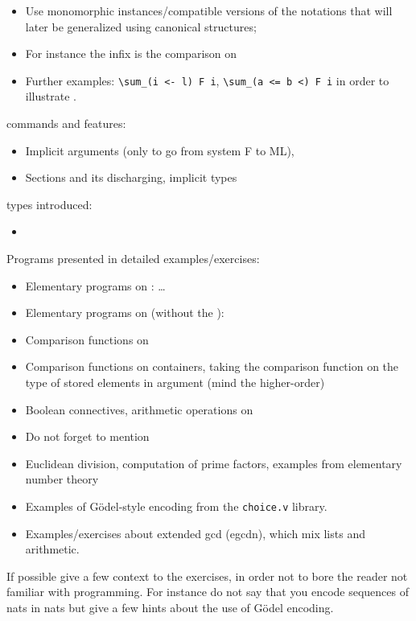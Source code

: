 \begin{itemize}
\item Use monomorphic instances/compatible versions of the notations
  that will later be generalized using canonical structures;
\item For instance the infix \C{==} is the comparison on 
\item Further examples: \verb+\sum_(i <- l) F i+, \verb+\sum_(a <= b <) F i+
in order to illustrate .
\end{itemize}
\Coq{} commands and features:
\begin{itemize}
\item Implicit arguments (only to go from system F to ML), 
\item Sections and its discharging, implicit types
\end{itemize}


\Coq{} types introduced:
\begin{itemize}
\item {}
\end{itemize}

Programs presented in detailed examples/exercises:
\begin{itemize}
\item Elementary programs on : \dots
\item Elementary programs on  (without the ):
\item Comparison functions on 
\item Comparison functions on containers, taking the comparison
  function on the type of stored elements in argument (mind the
  higher-order)
\item Boolean connectives, arithmetic operations on 
\item Do not forget to mention 
\item Euclidean division, computation of prime factors, examples from
  elementary number theory
\item Examples of G{\"o}del-style encoding from the {\tt choice.v} library.
\item Examples/exercises about extended gcd (egcdn), which mix lists
  and arithmetic.
\end{itemize}
If possible give a few context to the exercises, in order not to bore
the reader not familiar with programming. For instance do not say that
you encode sequences of nats in nats but give a few hints about the
use of G{\"o}del encoding.


